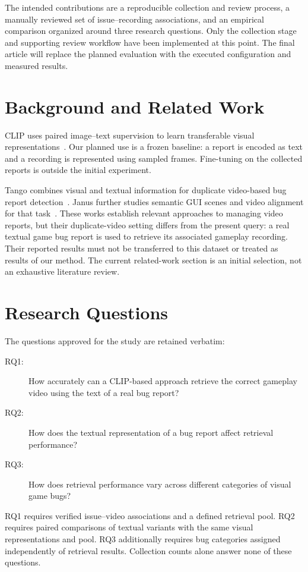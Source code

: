 \documentclass[journal,a4paper,onecolumn]{IEEEtran}
\begin{document}
The intended contributions are a reproducible collection and review process, a manually reviewed set of issue--recording associations, and an empirical comparison organized around three research questions. Only the collection stage and supporting review workflow have been implemented at this point. The final article will replace the planned evaluation with the executed configuration and measured results.

\section{Background and Related Work}
CLIP uses paired image--text supervision to learn transferable visual representations~\cite{radford2021}. Our planned use is a frozen baseline: a report is encoded as text and a recording is represented using sampled frames. Fine-tuning on the collected reports is outside the initial experiment.

Tango combines visual and textual information for duplicate video-based bug report detection~\cite{cooper2021}. Janus further studies semantic GUI scenes and video alignment for that task~\cite{yan2024}. These works establish relevant approaches to managing video reports, but their duplicate-video setting differs from the present query: a real textual game bug report is used to retrieve its associated gameplay recording. Their reported results must not be transferred to this dataset or treated as results of our method. The current related-work section is an initial selection, not an exhaustive literature review.

\section{Research Questions}
The questions approved for the study are retained verbatim:
\begin{description}
\item[RQ1:] How accurately can a CLIP-based approach retrieve the correct gameplay video using the text of a real bug report?
\item[RQ2:] How does the textual representation of a bug report affect retrieval performance?
\item[RQ3:] How does retrieval performance vary across different categories of visual game bugs?
\end{description}

RQ1 requires verified issue--video associations and a defined retrieval pool. RQ2 requires paired comparisons of textual variants with the same visual representations and pool. RQ3 additionally requires bug categories assigned independently of retrieval results. Collection counts alone answer none of these questions.
\end{document}
